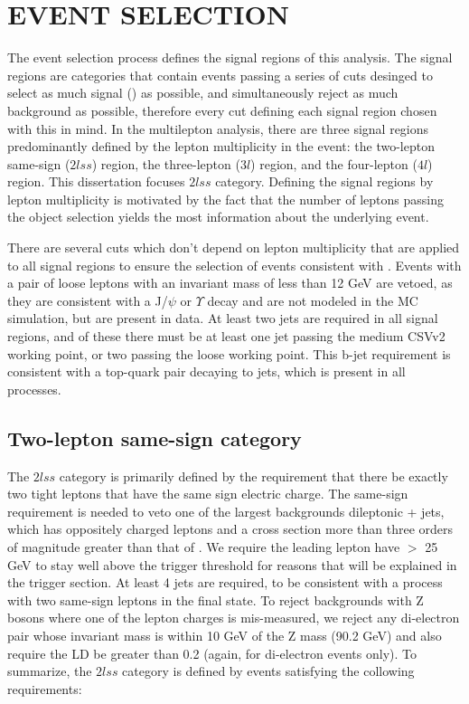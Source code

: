 %
%

\chapter{EVENT SELECTION}
The event selection process defines the signal regions of this analysis. The signal regions are categories that contain events passing a series of cuts desinged to 
select as much signal (\tth) as possible, and simultaneously reject as much background as possible, therefore every cut defining each signal region chosen with this
in mind. In the multilepton analysis, there are three signal regions predominantly defined by the lepton multiplicity in the event: the two-lepton same-sign ($2lss$) region,
the three-lepton ($3l$) region, and the four-lepton ($4l$) region. This dissertation focuses $2lss$ category. Defining the signal regions by lepton multiplicity is motivated
by the fact that the number of leptons passing the object selection yields the most information about the underlying event.

There are several cuts which don't depend on lepton multiplicity that are applied to all signal regions to ensure the selection of events consistent with \tth. Events with
a pair of loose leptons with an invariant mass of less than 12 GeV are vetoed, as they are consistent with a J/$\psi$ or $\Upsilon$ decay and are not modeled in the MC
simulation, but are present in data. At least two jets are required in all signal regions, and of these there must be at least one jet passing the medium CSVv2 working point,
or two passing the loose working point. This b-jet requirement is consistent with a top-quark pair decaying to jets, which is present in all \tth processes. 

\section{Two-lepton same-sign category}
The $2lss$ category is primarily defined by the requirement that there be exactly two tight leptons that have the same sign electric charge. The same-sign requirement is needed to veto 
one of the largest backgrounds dileptonic \ttbar + jets, which has oppositely charged leptons and a cross section more than three orders of magnitude greater than that of \tth. We require
the leading lepton have \pt $>$ 25 GeV to stay well above the trigger threshold for reasons that will be explained in the trigger section. At least 4 jets are required, to be consistent with
a \tth process with two same-sign leptons in the final state. To reject backgrounds with Z bosons where one of the lepton charges is mis-measured, we reject any di-electron pair whose invariant
mass is within 10 GeV of the Z mass (90.2 GeV) and also require the \met LD be greater than 0.2 (again, for di-electron events only). To summarize, the $2lss$ category is defined by events
satisfying the collowing requirements:

